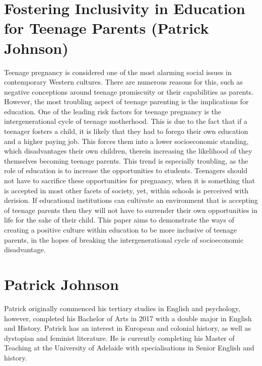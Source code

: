 \documentclass[twoside,12pt,a4paper,notitlepage]{memoir}
\begin{document}
\pagebreak
\section*{Fostering Inclusivity in Education for Teenage Parents (Patrick Johnson)}
\label{aut:johnson}

Teenage pregnancy is considered one of the most alarming social issues in contemporary Western cultures. There are numerous reasons for this, such as negative conceptions around teenage promiscuity or their capabilities as parents. However, the most troubling aspect of teenage parenting is the implications for education. One of the leading risk factors for teenage pregnancy is the intergenerational cycle of teenage motherhood. This is due to the fact that if a teenager fosters a child, it is likely that they had to forego their own education and a higher paying job. This forces them into a lower socioeconomic standing, which disadvantages their own children, therein increasing the likelihood of they themselves becoming teenage parents. This trend is especially troubling, as the role of education is to increase the opportunities to students. Teenagers should not have to sacrifice these opportunities for pregnancy, when it is something that is accepted in most other facets of society, yet, within schools is perceived with derision. If educational institutions can cultivate an environment that is accepting of teenage parents then they will not have to surrender their own opportunities in life for the sake of their child. This paper aims to demonstrate the ways of creating a positive culture within education to be more inclusive of teenage parents, in the hopes of breaking the intergenerational cycle of socioeconomic disadvantage. 

\section*{Patrick Johnson}

Patrick originally commenced his tertiary studies in English and psychology, however, completed his Bachelor of Arts in 2017 with a double major in English and History. Patrick has an interest in European and colonial history, as well as dystopian and feminist literature. He is currently completing his Master of Teaching at the University of Adelaide with specialisations in Senior English and history.
\end{document}

